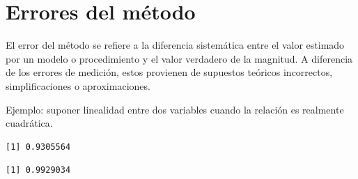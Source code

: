 \documentclass[
  spanish,
  letterpaper,
  DIV=11,
  numbers=noendperiod]{scrreprt}
\newenvironment{Shaded}{\begin{snugshade}}{\end{snugshade}}
\newcommand{\AttributeTok}[1]{\textcolor[rgb]{0.40,0.45,0.13}{#1}}
\newcommand{\ConstantTok}[1]{\textcolor[rgb]{0.56,0.35,0.01}{#1}}
\newcommand{\DecValTok}[1]{\textcolor[rgb]{0.68,0.00,0.00}{#1}}
\newcommand{\FunctionTok}[1]{\textcolor[rgb]{0.28,0.35,0.67}{#1}}
\newcommand{\NormalTok}[1]{\textcolor[rgb]{0.00,0.23,0.31}{#1}}
\newcommand{\OtherTok}[1]{\textcolor[rgb]{0.00,0.23,0.31}{#1}}
\newcommand{\SpecialCharTok}[1]{\textcolor[rgb]{0.37,0.37,0.37}{#1}}
\begin{document}
\section{Errores del método}\label{errores-del-muxe9todo}

El error del método se refiere a la diferencia sistemática entre el
valor estimado por un modelo o procedimiento y el valor verdadero de la
magnitud. A diferencia de los errores de medición, estos provienen de
supuestos teóricos incorrectos, simplificaciones o aproximaciones.

Ejemplo: suponer linealidad entre dos variables cuando la relación es
realmente cuadrática.

\begin{Shaded}
\end{Shaded}

\begin{verbatim}
[1] 0.9305564
\end{verbatim}

\begin{Shaded}
\end{Shaded}

\begin{verbatim}
[1] 0.9929034
\end{verbatim}
\end{document}
